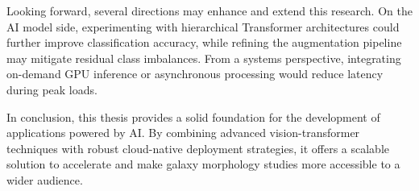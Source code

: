 Looking forward, several directions may enhance and extend this research. On the AI model side, experimenting with hierarchical Transformer architectures could further improve classification accuracy, while refining the augmentation pipeline may mitigate residual class imbalances. From a systems perspective, integrating on-demand GPU inference or asynchronous processing would reduce latency during peak loads.

In conclusion, this thesis provides a solid foundation for the development of applications powered by AI. By combining advanced vision-transformer techniques with robust cloud-native deployment strategies, it offers a scalable solution to accelerate and make galaxy morphology studies more accessible to a wider audience.


% 